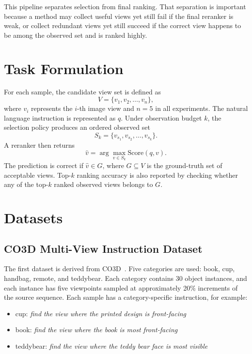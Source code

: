 This pipeline separates selection from final ranking. That separation is important because a method may collect useful views yet still fail if the final reranker is weak, or collect redundant views yet still succeed if the correct view happens to be among the observed set and is ranked highly.

\section{Task Formulation}

For each sample, the candidate view set is defined as
\[
V = \{v_1, v_2, \ldots, v_n\},
\]
where \(v_i\) represents the \(i\)-th image view and \(n=5\) in all experiments. The natural language instruction is represented as \(q\). Under observation budget \(k\), the selection policy produces an ordered observed set
\[
S_k = \{v_{s_1}, v_{s_2}, \ldots, v_{s_k}\}.
\]
A reranker then returns
\[
\hat{v} = \arg\max_{v \in S_k} \mathrm{Score}(q, v).
\]
The prediction is correct if \(\hat{v} \in G\), where \(G \subseteq V\) is the ground-truth set of acceptable views. Top-\(k\) ranking accuracy is also reported by checking whether any of the top-\(k\) ranked observed views belongs to \(G\).

\section{Datasets}

\subsection{CO3D Multi-View Instruction Dataset}

The first dataset is derived from CO3D~\cite{reizenstein_common_2021}. Five categories are used: book, cup, handbag, remote, and teddybear. Each category contains 30 object instances, and each instance has five viewpoints sampled at approximately 20\% increments of the source sequence. Each sample has a category-specific instruction, for example:

\begin{itemize}
    \item cup: \textit{find the view where the printed design is front-facing}
    \item book: \textit{find the view where the book is most front-facing}
    \item teddybear: \textit{find the view where the teddy bear face is most visible}
\end{itemize}

